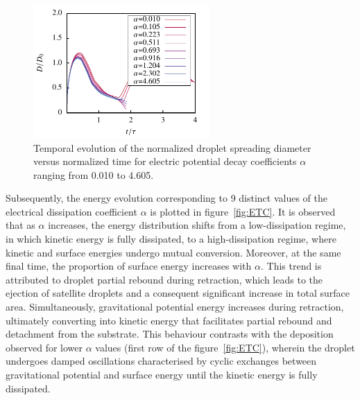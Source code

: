 \documentclass[lineno]{cls/jfm}
\begin{document}
 \begin{figure}
  \centerline{\includegraphics[width=0.6\textwidth]{fig/dropR.pdf}}
  \caption{Temporal evolution of the normalized droplet spreading diameter versus normalized time for electric potential decay coefficients $\alpha$ ranging from 0.010 to 4.605.}
 \label{fig:dropR}
 \end{figure}

 Subsequently, the energy evolution corresponding to 9 distinct values of the electrical dissipation coefficient $\alpha$ is plotted in figure~\ref{fig:ETC}. It is observed that as $\alpha$ increases, the energy distribution shifts from a low-dissipation regime, in which kinetic energy is fully dissipated, to a high-dissipation regime, where kinetic and surface energies undergo mutual conversion. Moreover, at the same final time, the proportion of surface energy increases with $\alpha$. This trend is attributed to droplet partial rebound during retraction, which leads to the ejection of satellite droplets and a consequent significant increase in total surface area. Simultaneously, gravitational potential energy increases during retraction, ultimately converting into kinetic energy that facilitates partial rebound and detachment from the substrate. This behaviour contrasts with the deposition observed for lower $\alpha$ values (first row of the figure~\ref{fig:ETC}), wherein the droplet undergoes damped oscillations characterised by cyclic exchanges between gravitational potential and surface energy until the kinetic energy is fully dissipated.
\end{document}
